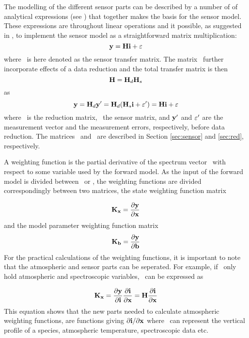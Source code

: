  The modelling of the different sensor parts can be described by a
 number of of analytical expressions (see \citet{eriksson:97a}) that
 together makes the basis for the sensor model. These expressions are
 throughout linear operations and it possible, as suggested in
 \citet{eriksson:00a}, to implement the sensor model as a
 straightforward matrix multiplication:
 \begin{equation}
   \mathbf{y} = \mathbf{H} \mathbf{i} + \varepsilon
  \label{eq:formalism:H}
 \end{equation}
 where \Hm\ is here denoted as the sensor transfer matrix.  The matrix
 \Hm\ further incorporate effects of a data reduction and
 the total transfer matrix is then
 \begin{equation}
   \mathbf{H} = \mathbf{H}_d \mathbf{H}_s
  \label{eq:formalism:Hs}
 \end{equation}
 as
 \begin{equation}
   \mathbf{y} = \mathbf{H}_d \mathbf{y}' = \mathbf{H}_d (\mathbf{H}_s \mathbf{i} + \varepsilon') = \mathbf{H} \mathbf{i} + \varepsilon
  \label{eq:formalism:datared}
 \end{equation}
 where \Hd\ is the reduction matrix, \Hs\ the sensor matrix, and $\mathbf{y}'$
 and $\varepsilon'$ are the measurement vector and the measurement errors,
 respectively, before data reduction. The matrices \Hd\ and \Hs\ are
 described in Section \ref{sec:sensor} and \ref{sec:red}, respectively.



 \label{sec:formalism:wfuns}

 A weighting function is the partial derivative of the spectrum vector
 \y\ with respect to some variable used by the forward model.  As the
 input of the forward model is divided between \xt\ or \bt, the
 weighting functions are divided correspondingly between two matrices,
 the state weighting function matrix

 \begin{equation}
   \mathbf{K_x} = \frac{\partial \mathbf{y}}{\partial \mathbf{x}}
  \label{eq:formalism:kx}
 \end{equation}
 and the model parameter weighting function matrix
 \begin{equation}
   \mathbf{K_b} = \frac{\partial \mathbf{y}}{\partial \mathbf{b}}
  \label{eq:formalism:kb}
 \end{equation}
 For the practical calculations of the weighting functions, it is
 important to note that the atmospheric and sensor parts can be
 seperated. For example, if \xt\ only hold atmospheric and
 spectroscopic variables, \Kx\ can be expressed as

 \begin{equation}
   \mathbf{K_x} = \frac{\partial \mathbf{y}}{\partial \mathbf{i}}\frac{\partial\mathbf{i}}{\partial \mathbf{x}} =
    \mathbf{H}\frac{\partial\mathbf{i}}{\partial \mathbf{x}}
  \label{eq:formalism:kx2}
 \end{equation}
 This equation shows that the new parts needed to calculate
 atmospheric weighting functions, are functions giving $\partial\mathbf{i} /
 \partial \mathbf{x}$ where \xt\ can represent the vertical profile of a
 species, atmospheric temperature, spectroscopic data etc.


